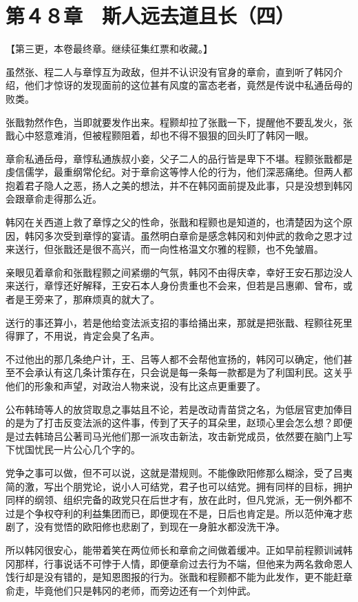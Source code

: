 \section{第４８章　斯人远去道且长（四）}

【第三更，本卷最终章。继续征集红票和收藏。】

虽然张、程二人与章惇互为政敌，但并不认识没有官身的章俞，直到听了韩冈介绍，他们才惊讶的发现面前的这位甚有风度的富态老者，竟然是传说中私通岳母的败类。

张戬勃然作色，当即就要发作出来。程颢却拉了张戬一下，提醒他不要乱发火，张戬心中怒意难消，但被程颢阻着，却也不得不狠狠的回头盯了韩冈一眼。

章俞私通岳母，章惇私通族叔小妾，父子二人的品行皆是卑下不堪。程颢张戬都是虔信儒学，最重纲常伦纪。对于章俞这等悖人伦的行为，他们深恶痛绝。但两人都抱着君子隐人之恶，扬人之美的想法，并不在韩冈面前提及此事，只是没想到韩冈会跟章俞走得那么近。

韩冈在关西道上救了章惇之父的性命，张戬和程颢也是知道的，也清楚因为这个原因，韩冈多次受到章惇的宴请。虽然明白章俞是感念韩冈和刘仲武的救命之恩才过来送行，但张戬还是很不高兴，而一向性格温文尔雅的程颢，也不免皱眉。

亲眼见着章俞和张戬程颢之间紧绷的气氛，韩冈不由得庆幸，幸好王安石那边没人来送行，章惇还好解释，王安石本人身份贵重也不会来，但若是吕惠卿、曾布，或者是王旁来了，那麻烦真的就大了。

送行的事还算小，若是他给变法派支招的事给捅出来，那就是把张戬、程颢往死里得罪了，不用说，肯定会臭了名声。

不过他出的那几条绝户计，王、吕等人都不会帮他宣扬的，韩冈可以确定，他们甚至不会承认有这几条计策存在，只会说是每一条每一款都是为了利国利民。这关乎他们的形象和声望，对政治人物来说，没有比这点更重要了。

公布韩琦等人的放贷取息之事姑且不论，若是改动青苗贷之名，为低层官吏加俸目的是为了打击反变法派的这件事，传到了天子的耳朵里，赵顼心里会怎么想？即便是过去韩琦吕公著司马光他们那一派攻击新法，攻击新党成员，依然要在脑门上写下忧国忧民一片公心几个字的。

党争之事可以做，但不可以说，这就是潜规则。不能像欧阳修那么糊涂，受了吕夷简的激，写出个朋党论，说小人可结党，君子也可以结党。拥有同样的目标，拥护同样的纲领、组织完备的政党只在后世才有，放在此时，但凡党派，无一例外都不过是个争权夺利的利益集团而已，即便现在不是，日后也肯定是。所以范仲淹才悲剧了，没有觉悟的欧阳修也悲剧了，到现在一身脏水都没洗干净。

所以韩冈很安心，能带着笑在两位师长和章俞之间做着缓冲。正如早前程颢训诫韩冈那样，行事说话不可悖于人情，即便章俞过去行为不端，但他来为两名救命恩人饯行却是没有错的，是知恩图报的行为。张戬和程颢都不能为此发作，更不能赶章俞走，毕竟他们只是韩冈的老师，而旁边还有一个刘仲武。

